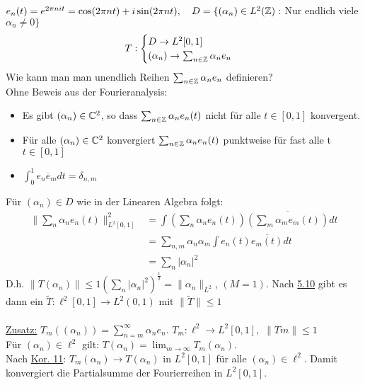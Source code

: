 \begin{beispiel}
	$e_{n} (t) = e^{2 \pi n i t} = \cos(2 \pi n t) + i \sin(2 \pi n t), \quad D = \{ (\alpha_{n}) \in L^{2}(\mathbb{Z}):$ Nur endlich viele $\alpha_{n} \neq 0 \}$
	\[ T : \begin{cases} D \rightarrow L^{2}[0, 1] \\ (\alpha_{n}) \rightarrow \sum_{n \in \mathbb{Z}} \alpha_{n} e_{n} \end{cases} \]
	Wie kann man man unendlich Reihen $\sum_{n \in \mathbb{Z}} \alpha_{n} e_{n}$ definieren? \\
	Ohne Beweis aus der Fourieranalysis:
	\begin{itemize}
		\item Es gibt $(\alpha_{n}) \in \mathbb{C}^{2}$, so dass $\sum_{n \in \mathbb{Z}} \alpha_{n} e_{n}(t)$ nicht für alle $t \in [0, 1]$ konvergent.
		\item Für alle $(\alpha_{n}) \in \mathbb{C}^{2}$ konvergiert $\sum_{n \in \mathbb{Z}} \alpha_{n} e_{n}(t)$ punktweise für fast alle t $t \in [0, 1]$
		\item $\int_{0}^{1} e_{n} \overline e_{m} dt = \delta_{n, m}$
	\end{itemize}
	Für $(\alpha_{n}) \in D$ wie in der Linearen Algebra folgt:
	\begin{align*}
		\| \sum_{n} \alpha_{n} e_{n}(t) \|_{L^{2}[0, 1]}^{2} & = \int (\sum_{n} \alpha_{n} e_{n}(t)) \overline{(\sum_{m} \alpha_{m} e_{m}(t))} dt \\
		& = \sum_{n, m} \alpha_{n} \alpha_{m} \int e_{n}(t) \overline{e_{m}(t)} dt \\
		& = \sum_{n} |\alpha_{n}|^2
	\end{align*}
	D.h. $\| T (\alpha_{n}) \| \leq 1 \left( \sum_{n} |\alpha_{n}|^2 \right)^{\frac{1}{2}} = \| \alpha_{n} \|_{L^{2}}$, $(M = 1)$. Nach \hyperref[prop:5.10]{5.10} gibt es dann ein $\tilde T: \ell^{2}[0, 1] \rightarrow L^{2}(0, 1)$ mit $\| \tilde T \| \leq 1$ \\ \\
	\uline{Zusatz:} $T_{m}((\alpha_{n})) = \sum_{n = m}^{\infty} \alpha_{n} e_{n}$. $T_{m}: \ell^{2} \rightarrow L^{2}[0, 1],$ $\| Tm \| \leq 1$ \\
	Für $(\alpha_{n}) \in \ell^{2}$ gilt: $T (\alpha_{n}) = \lim_{m \rightarrow \infty} T_{m}(\alpha_{n})$. \\
	Nach \hyperref[kor:5.11]{Kor. 11}: $T_{m}(\alpha_{n}) \rightarrow T (\alpha_{n})$ in $L^{2}[0, 1]$ für alle $(\alpha_{n}) \in \ell^{2}$. Damit konvergiert die Partialsumme der Fourierreihen in $L^{2}[0, 1]$.
\end{beispiel}


